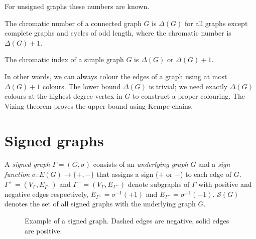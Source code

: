 For unsigned graphs these numbers are known.

\begin{theorem}
    The chromatic number of a connected graph $G$ is $\Delta(G)$ for all graphs except complete graphs and cycles of odd length, where the chromatic number is $\Delta(G) + 1$.
\end{theorem}

\begin{theorem}[Vizing]
    The chromatic index of a simple graph $G$ is $\Delta(G)$ or $\Delta(G) + 1$.
\end{theorem}

In other words, we can always colour the edges of a graph using at most $\Delta(G) + 1$ colours. The lower bound $\Delta(G)$ is trivial; we need exactly $\Delta(G)$ colours at the highest degree vertex in $G$ to construct a proper colouring. The Vizing theorem proves the upper bound using Kempe chains.

\section{Signed graphs}

A \textit{signed graph} $\Gamma = (G, \sigma)$ consists of an \textit{underlying graph} $G$ and a \textit{sign function} $\sigma : E(G) \rightarrow \{+,-\}$ that assigns a sign ($+$ or $-$) to each edge of $G$. $\Gamma ^+ = (V _{\Gamma}, E _{\Gamma ^+})$ and $\Gamma ^- = (V _{\Gamma}, E _{\Gamma ^-})$ denote subgraphs of $\Gamma$ with positive and negative edges respectively, $E _{\Gamma ^+} = \sigma ^{-1} (+1)$ and $E _{\Gamma ^-} = \sigma ^{-1} (-1)$. $\mathcal{S} (G)$ denotes the set of all signed graphs with the underlying graph $G$.

\begin{figure}[h]
    \centering
    \caption[Example of a signed graph]{Example of a signed graph. Dashed edges are negative, solid edges are positive.}
\end{figure}

